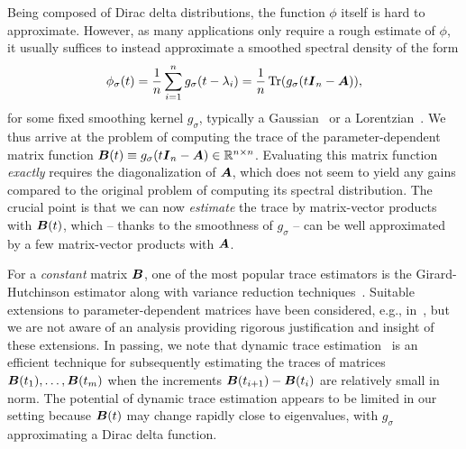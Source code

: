 Being composed of Dirac delta distributions, the function $\phi$ itself is hard to approximate. However, as many applications only require a rough estimate of $\phi$, it usually suffices to instead approximate a smoothed spectral density of the form
\begin{equation}
    \phi_{\sigma}(t) = \frac{1}{n} \sum_{i=1}^{n} g_{\sigma}(t - \lambda_i) = \frac{1}{n} \operatorname{Tr}(g_{\sigma}(t \boldsymbol{I}_n - \boldsymbol{A})),
    \label{equ:smoothed-spectral-density}
\end{equation}
for some fixed smoothing kernel $g_{\sigma}$, typically a Gaussian~\cite{lin-2016-approximating-spectral, lin-2017-randomized-estimation} or a Lorentzian~\cite{haydock-1972-electronic-structure, lin-2016-approximating-spectral}. We thus arrive at the problem of computing the trace of the parameter-dependent matrix function $\boldsymbol{B}(t) \equiv g_{\sigma}(t \boldsymbol{I}_n - \boldsymbol{A}) \in \mathbb{R}^{n \times n}$. Evaluating this matrix function \emph{exactly} requires the diagonalization of $\boldsymbol{A}$, which does not seem to yield any gains compared to the original problem of computing its spectral distribution. The crucial point is that we can now \emph{estimate} the trace by matrix-vector products with $\boldsymbol{B}(t)$, which -- thanks to the smoothness of $g_\sigma$ -- can be well approximated by a few matrix-vector products with $\boldsymbol{A}$.

For a \emph{constant} matrix $\boldsymbol{B}$, one of the most popular trace estimators is the Girard-Hutchinson estimator \cite{girard-1989-fast-montecarlo, hutchinson-1990-stochastic-estimator} along with variance reduction techniques~\cite{gambhir-2017-deflation-method, saibaba-2017-randomized-matrixfree, lin-2017-randomized-estimation, meyer-2021-hutch-optimal, persson-2022-improved-variants, chen-2023-krylovaware-stochastic, epperly-2024-xtrace-making}. Suitable extensions to parameter-dependent matrices have been considered, e.g., in~\cite{lin-2017-randomized-estimation,chen-2023-krylovaware-stochastic}, but we are not aware of an analysis providing rigorous justification and insight of these extensions. In passing, we note that dynamic trace estimation~\cite{dharangutte-2024-dynamic-trace,woodruff-2024-optimal-query} is an efficient technique for subsequently estimating the traces of matrices $\boldsymbol{B}(t_1), \dots, \boldsymbol{B}(t_m)$ when the increments $\boldsymbol{B}(t_{i+1}) - \boldsymbol{B}(t_i)$ are relatively small in norm. The potential of dynamic trace estimation appears to be limited in our setting because $\boldsymbol{B}(t)$ may change rapidly close to eigenvalues, with $g_{\sigma}$ approximating a Dirac delta function.

